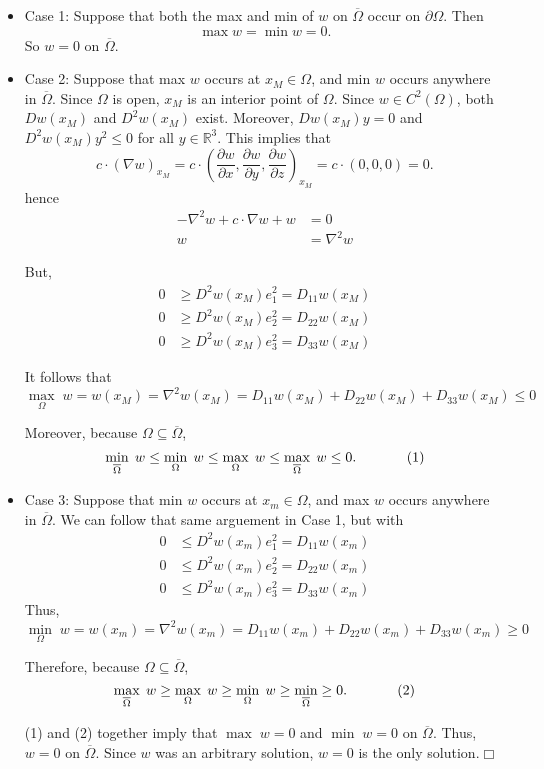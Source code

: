\documentclass[11pt]{article}
\begin{document}
\begin{itemize}
\item Case 1: Suppose that both the max and min of $w$ on $\overline{\Omega}$ occur on $\partial \Omega$. Then 
\[
\max w=\min w=0.
\]
\noindent So $w=0$ on $\overline{\Omega}$.

\item Case 2: Suppose that max $w$ occurs at $x_M\in \Omega$, and min $w$ occurs anywhere in $\overline{\Omega}$. Since $\Omega$ is open, $x_M$ is an interior point of $\Omega$. Since $w\in C^2(\Omega)$, both $Dw(x_M)$ and $D^2w(x_M)$ exist. Moreover, $Dw(x_M)y=0$ and $D^2w(x_M)y^2\leq 0$ for all $y\in \mathbb{R}^3$. This implies that 
\[
c\cdot \left(\nabla w\right)_{x_M}=c\cdot \left(\frac{\partial w}{\partial x},\frac{\partial w}{\partial y},\frac{\partial w}{\partial z}\right)_{x_M}=c\cdot \left(0,0,0\right)=0.
\]
hence
\begin{align*}
-\nabla ^2w+c\cdot \nabla w + w&=0 \\ w&=\nabla ^2w
\end{align*}

\noindent But, 
\begin{align*}
0&\geq D^2w(x_M)e_1^2=D_{11}w(x_M) \\ 0&\geq D^2w(x_M)e_2^2=D_{22}w(x_M) \\ 0&\geq D^2w(x_M)e_3^2=D_{33}w(x_M)
\end{align*}

\noindent It follows that 
\[
\max\limits_{\Omega}\;w=w(x_M)=\nabla ^2w(x_M)=D_{11}w(x_M)+D_{22}w(x_M)+D_{33}w(x_M)\leq 0
\]

\noindent Moreover, because $\Omega\subseteq \overline{\Omega}$,
\[
\min\limits_{\overline{\Omega}}\;w \leq \min\limits_{\Omega}\;w \leq \max\limits_{\Omega}\;w \leq \max\limits_{\overline{\Omega}}\;w \leq 0.\hspace{.5in}(1)
\]

\item Case 3: Suppose that min $w$ occurs at $x_m\in \Omega$, and max $w$ occurs anywhere in $\overline{\Omega}$. We can follow that same arguement in Case 1, but with
\begin{align*}
0&\leq D^2w(x_m)e_1^2=D_{11}w(x_m) \\ 0&\leq D^2w(x_m)e_2^2=D_{22}w(x_m) \\ 0&\leq D^2w(x_m)e_3^2=D_{33}w(x_m)
\end{align*}
Thus, 
\[
\min\limits_{\Omega}\;w=w(x_m)=\nabla ^2w(x_m)=D_{11}w(x_m)+D_{22}w(x_m)+D_{33}w(x_m)\geq 0
\]

\noindent Therefore, because $\Omega\subseteq \overline{\Omega}$,
\[
\max\limits_{\overline{\Omega}}\;w\geq \max\limits_\Omega\;w\geq \min\limits_\Omega\;w\geq\min\limits_{\overline{\Omega}}\geq 0.\hspace{.5in}(2)
\]

\vspace{.2in} (1) and (2) together imply that $\max\;w=0$ and $\min\;w=0$ on $\overline{\Omega}$. Thus, $w=0$ on $\overline{\Omega}$.  Since $w$ was an arbitrary solution, $w=0$ is the only solution.\hfill $\Box$


\end{itemize}
\end{document}
